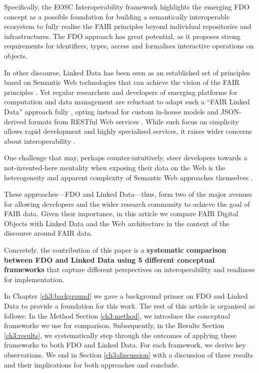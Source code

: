 Specifically, the EOSC Interoperability framework highlights the emerging 
\acrfull{FDO}
concept \cite{Schultes 2019} as a possible foundation for building a semantically interoperable ecosystem to fully realise the FAIR principles beyond individual repositories and infrastructures. The FDO approach has great potential, as it proposes strong requirements for identifiers, types, access and formalises interactive operations on objects.

In other discourse, Linked Data \cite{Bizer 2009} has been seen as an established set of principles based on Semantic Web technologies that can achieve the vision of the FAIR principles \cite{Bonino 2016,Hasnain 2018}. Yet regular researchers and developers of emerging platforms for computation and data management are reluctant to adapt such a ``FAIR Linked Data'' approach fully \cite{Verborgh 2020}, opting instead for custom in-house models and JSON-derived formats from RESTful Web services \cite{Meroño-Peñuela 2021a,Neumann 2021}. While such focus on simplicity allows rapid development and highly specialised services, it raises wider concerns about interoperability \cite{Turcoane 2014,Wilkinson 2022b}.

One challenge that may, perhaps counter-intuitively, steer developers towards a not-invented-here mentality \cite{Stefi 2015b,Stefi 2015a} when exposing their data on the Web is the heterogeneity and apparent complexity of Semantic Web approaches themselves \cite{Meroño-Peñuela 2021b}.

These approaches---FDO and Linked Data---thus, form two of the major avenues for allowing developers and the wider research community to achieve the goal of FAIR data. Given their importance, in this article we compare FAIR Digital Objects with Linked Data and the Web architecture in the context of the discourse around FAIR data.

Concretely, the contribution of this paper is a {\bf systematic comparison between FDO and Linked Data using 5 different conceptual frameworks} that capture different perspectives on interoperability and readiness for implementation.

In Chapter \vref{ch3:background} we gave a background primer on FDO and Linked Data to provide a foundation for this work. The rest of this article is organised as follows:  In the Method Section \vref{ch3:method}, we introduce the conceptual frameworks we use for comparison. Subsequently, in the Results Section \vref{ch3:results}, we systematically step through the outcomes of applying these frameworks to both FDO and Linked Data. For each framework, we derive key observations. We end in Section \vref{ch3:discussion} with a discussion of these results and their implications for both approaches and conclude.


